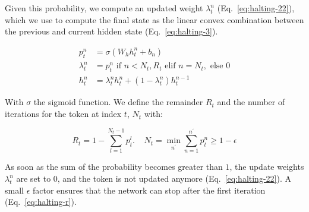 Given this probability, we compute an updated weight $\lambda^n_t$ (Eq.~\ref{eq:halting-22}), which we use to compute the final state as the linear convex combination between the previous and current hidden state (Eq.~\ref{eq:halting-3}). 


\begin{align}
    p^n_t &= \sigma\left(W_hh^n_t+b_n\right) \label{eq:halting-1}\\
    \lambda^n_t &=  p^n_t \text{ if } n < N_t, R_t \text{ elif } n = N_t, \text{ else } 0 \label{eq:halting-22}\\
    h^n_t &= \lambda^n_th^n_t + (1-\lambda^n_t)h^{n-1}_t \label{eq:halting-3}
\end{align}

With $\sigma$ the sigmoid function. We define the remainder $R_t$ and the number of iterations for the token at index $t$, $N_t$ with:

\begin{equation}
R_t=1-\sum_{l=1}^{N_t-1}p^l_t. ~~~~~N_{t}=\min_{n^{\prime}}\sum_{n=1}^{n^{\prime}}p^n_t \geq 1-\epsilon \label{eq:halting-r}
\end{equation}

As soon as the sum of the probability becomes greater than $1$, the update weights $\lambda^n_t$ are set to 0, and the token is not updated anymore (Eq.~\ref{eq:halting-22}). A small $\epsilon$ factor ensures that the network can stop after the first iteration (Eq.~\ref{eq:halting-r}).

